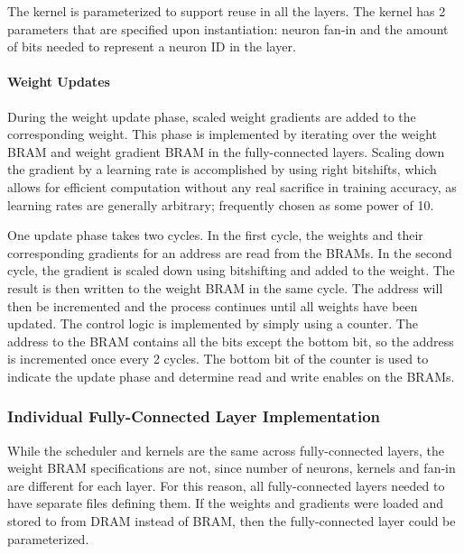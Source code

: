 The kernel is parameterized to support reuse in all the layers. The kernel has 2 parameters that are specified upon instantiation: neuron fan-in and the amount of bits needed to represent a neuron ID in the layer.

\paragraph{Weight Updates}
During the weight update phase, scaled weight gradients are added to the corresponding weight. This phase is implemented by iterating over the weight BRAM and weight gradient BRAM in the fully-connected layers. Scaling down the gradient by a learning rate is accomplished by using right bitshifts, which allows for efficient computation without any real sacrifice in training accuracy, as learning rates are generally arbitrary; frequently chosen as some power of 10.

One update phase takes two cycles. In the first cycle, the weights and their corresponding gradients for an address are read from the BRAMs. In the second cycle, the gradient is scaled down using bitshifting and added to the weight. The result is then written to the weight BRAM in the same cycle. The address will then be incremented and the process continues until all weights have been updated. The control logic is implemented by simply using a counter. The address to the BRAM contains all the bits except the bottom bit, so the address is incremented once every 2 cycles. The bottom bit of the counter is used to indicate the update phase and determine read and write enables on the BRAMs.

\subsubsection{Individual Fully-Connected Layer Implementation}
While the scheduler and kernels are the same across fully-connected layers, the weight BRAM specifications are not, since number of neurons, kernels and fan-in are different for each layer. For this reason, all fully-connected layers needed to have separate files defining them. If the weights and gradients were loaded and stored to from DRAM instead of BRAM, then the fully-connected layer could be parameterized.


